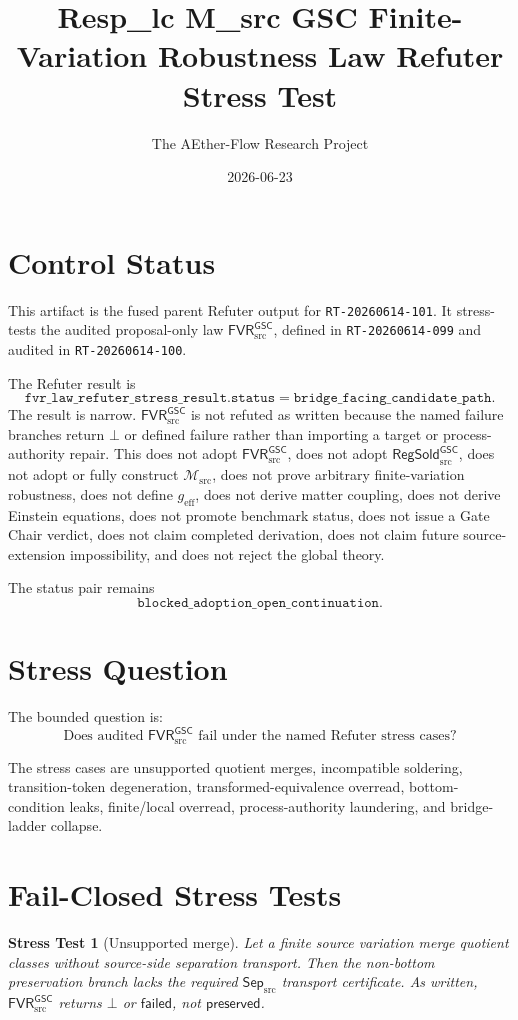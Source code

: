 \documentclass[11pt]{article}
\title{Resp\_lc M\_src GSC Finite-Variation Robustness Law Refuter Stress Test}
\author{The AEther-Flow Research Project}
\date{2026-06-23}
\newcommand{\Msrc}{\mathcal{M}_{\mathrm{src}}}
\newcommand{\geff}{g_{\mathrm{eff}}}
\newcommand{\RegSold}{\mathsf{RegSold}_{\mathrm{src}}^{\mathsf{GSC}}}
\newcommand{\FVR}{\mathsf{FVR}_{\mathrm{src}}^{\mathsf{GSC}}}
\newcommand{\SepSrc}{\mathsf{Sep}_{\mathrm{src}}}
\newcommand{\Bot}{\bot}
\newtheorem{stress}{Stress Test}
\begin{document}
\maketitle

\section*{Control Status}

This artifact is the fused parent Refuter output for
\texttt{RT-20260614-101}. It stress-tests the audited proposal-only law
\(\FVR\), defined in \texttt{RT-20260614-099} and audited in
\texttt{RT-20260614-100}.

The Refuter result is
\[
  \texttt{fvr\_law\_refuter\_stress\_result.status}
  =
  \texttt{bridge\_facing\_candidate\_path}.
\]
The result is narrow. \(\FVR\) is not refuted as written because the named
failure branches return \(\Bot\) or defined failure rather than importing a
target or process-authority repair. This does not adopt \(\FVR\), does not
adopt \(\RegSold\), does not adopt or fully construct \(\Msrc\), does not
prove arbitrary finite-variation robustness, does not define \(\geff\), does
not derive matter coupling, does not derive Einstein equations, does not
promote benchmark status, does not issue a Gate Chair verdict, does not claim
completed derivation, does not claim future source-extension impossibility,
and does not reject the global theory.

The status pair remains
\[
  \texttt{blocked\_adoption\_open\_continuation}.
\]

\section{Stress Question}

The bounded question is:
\[
  \text{Does audited }\FVR\text{ fail under the named Refuter stress cases?}
\]

The stress cases are unsupported quotient merges, incompatible soldering,
transition-token degeneration, transformed-equivalence overread,
bottom-condition leaks, finite/local overread, process-authority laundering,
and bridge-ladder collapse.

\section{Fail-Closed Stress Tests}

\begin{stress}[Unsupported merge]
Let a finite source variation merge quotient classes without source-side
separation transport. Then the non-bottom preservation branch lacks the
required \(\SepSrc\) transport certificate. As written, \(\FVR\) returns
\(\Bot\) or \(\mathsf{failed}\), not \(\mathsf{preserved}\).
\end{stress}
\end{document}

